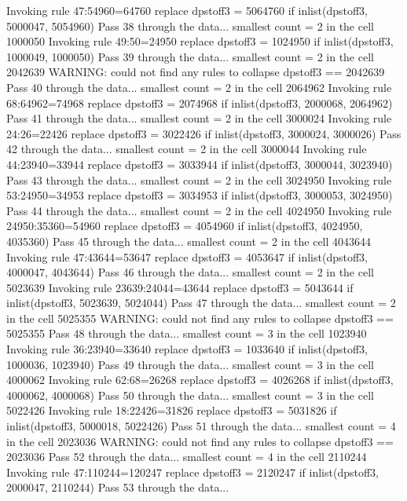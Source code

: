   Invoking rule 47:54960=64760
  replace dpstoff3 = 5064760 if inlist(dpstoff3, 5000047, 5054960)
Pass 38 through the data...
  smallest count = 2 in the cell      1000050
  Invoking rule 49:50=24950
  replace dpstoff3 = 1024950 if inlist(dpstoff3, 1000049, 1000050)
Pass 39 through the data...
  smallest count = 2 in the cell      2042639
  WARNING: could not find any rules to collapse dpstoff3 == 2042639
Pass 40 through the data...
  smallest count = 2 in the cell      2064962
  Invoking rule 68:64962=74968
  replace dpstoff3 = 2074968 if inlist(dpstoff3, 2000068, 2064962)
Pass 41 through the data...
  smallest count = 2 in the cell      3000024
  Invoking rule 24:26=22426
  replace dpstoff3 = 3022426 if inlist(dpstoff3, 3000024, 3000026)
Pass 42 through the data...
  smallest count = 2 in the cell      3000044
  Invoking rule 44:23940=33944
  replace dpstoff3 = 3033944 if inlist(dpstoff3, 3000044, 3023940)
Pass 43 through the data...
  smallest count = 2 in the cell      3024950
  Invoking rule 53:24950=34953
  replace dpstoff3 = 3034953 if inlist(dpstoff3, 3000053, 3024950)
Pass 44 through the data...
  smallest count = 2 in the cell      4024950
  Invoking rule 24950:35360=54960
  replace dpstoff3 = 4054960 if inlist(dpstoff3, 4024950, 4035360)
Pass 45 through the data...
  smallest count = 2 in the cell      4043644
  Invoking rule 47:43644=53647
  replace dpstoff3 = 4053647 if inlist(dpstoff3, 4000047, 4043644)
Pass 46 through the data...
  smallest count = 2 in the cell      5023639
  Invoking rule 23639:24044=43644
  replace dpstoff3 = 5043644 if inlist(dpstoff3, 5023639, 5024044)
Pass 47 through the data...
  smallest count = 2 in the cell      5025355
  WARNING: could not find any rules to collapse dpstoff3 == 5025355
Pass 48 through the data...
  smallest count = 3 in the cell      1023940
  Invoking rule 36:23940=33640
  replace dpstoff3 = 1033640 if inlist(dpstoff3, 1000036, 1023940)
Pass 49 through the data...
  smallest count = 3 in the cell      4000062
  Invoking rule 62:68=26268
  replace dpstoff3 = 4026268 if inlist(dpstoff3, 4000062, 4000068)
Pass 50 through the data...
  smallest count = 3 in the cell      5022426
  Invoking rule 18:22426=31826
  replace dpstoff3 = 5031826 if inlist(dpstoff3, 5000018, 5022426)
Pass 51 through the data...
  smallest count = 4 in the cell      2023036
  WARNING: could not find any rules to collapse dpstoff3 == 2023036
Pass 52 through the data...
  smallest count = 4 in the cell      2110244
  Invoking rule 47:110244=120247
  replace dpstoff3 = 2120247 if inlist(dpstoff3, 2000047, 2110244)
Pass 53 through the data...
